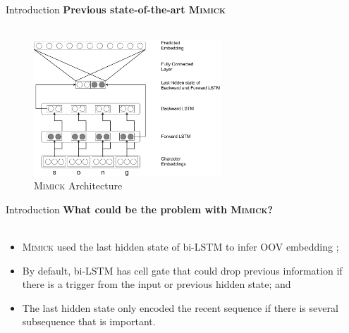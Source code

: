\documentclass{beamer}
\begin{document}
\begin{frame}{Introduction}
    \textbf{Previous state-of-the-art \textsc{Mimick}}\\~\\

    \begin{figure}[H]
        \centering
        \includegraphics[width=70mm]{images/mimick}
        \caption{\textsc{Mimick} Architecture}
    \end{figure}
\end{frame}


\begin{frame}{Introduction}
    \textbf{What could be the problem with \textsc{Mimick}?}\\~\\

    \begin{itemize}
        \item \textsc{Mimick} used the last hidden state of bi-LSTM to
        infer OOV embedding \cite{mimicking2017Pinter};
        \item By default, bi-LSTM has cell gate that could drop
        previous information if there is a trigger from the input or
        previous hidden state; and 
        \item The last hidden state only encoded the recent sequence
        if there is several subsequence that is important.
    \end{itemize}
\end{frame}





\end{document}
